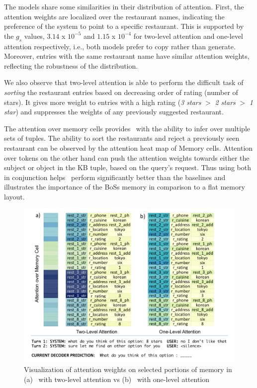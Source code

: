 The models share some similarities in their distribution of attention. First, the attention weights are localized over the restaurant names, indicating the preference of the system to point to a specific restaurant. This is supported by the $g_s$ values, $3.14$ x $10^{-5}$ and $1.15$ x $10^{-4}$ for two-level attention and one-level attention respectively, i.e., both models prefer to copy rather than generate. Moreover, entries with the same restaurant name have similar attention weights, reflecting the robustness of the distribution.

We also observe that two-level attention is able to perform the difficult task of {\em sorting} the restaurant entries based on decreasing order of rating (number of stars). It gives more weight to entries with a high rating 
(\textit{3 stars} $>$ \textit{2 stars} $>$ \textit{1 star})
and suppresses the weights of any previously suggested restaurant.

The attention over memory cells provides \sys\ with the ability to infer over multiple sets of tuples. The ability to sort the restaurants and reject a previously seen restaurant can be observed by the attention heat map of Memory cells. Attention over tokens on the other hand can push the attention weights towards either the subject or object in the KB tuple, based on the query's request. Thus using both in conjunction helps \sys\ perform significantly better than the baselines and illustrates the importance of the {\sc BoSs} memory in comparison to a flat memory layout.

\begin{figure}[ht]
\centering
\includegraphics[width=\textwidth]{assets/task3_two_level.png}
\caption{Visualization of attention weights on selected portions of memory in (a) \sys\ with two-level attention vs (b) \sys\ with one-level attention}
\label{fig:attention}
\end{figure}

